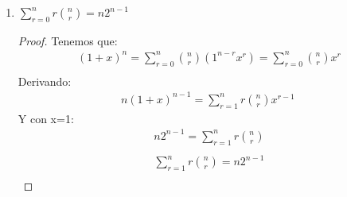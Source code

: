 \begin{enumerate}
\begin{enumerate}
\begin{proof}
\begin{align*}
                (x+y)^{n+1} &= (x+y)(x+y)^n = (x+y) \sum_{r=0}^{n+1} \binom{n}{r} x^{n-r}y^{r}\\
                &=x \sum_{r=0}^{n} \binom{n}{r} x^{n-r}y^{r} +  y \sum_{r=0}^{n} \binom{n}{r} x^{n-r}y^{r}\\
                &=\sum_{r=0}^{n} \binom{n}{r} x^{(n-1)-r}y^{r} +  y \sum_{r=1}^{n+1} \binom{n}{r-1} x^{n-(r-1)}y^{r}\\
                &=\binom{n}{0} x^{n+1}y^{0} + \sum_{r=1}^{n} \binom{n}{r} x^{(n+1)-r}y^{r} \\
                &+ \sum_{r=1}^{n} \binom{n}{r-1} x^{(n+1)-r}y^{r} + \binom{n}{n+r-1} x^{n-(r-1)}y^{n+1}\\
                &=x^{n+1} + \sum_{r=1}^{n} \binom{n}{r} x^{(n+1)-r}y^{r} +\sum_{r=1}^{n} \binom{n}{r-1} x^{n+1-r)}y^{r} + y^{n+1}\\
                &=x^{n+1} + \sum_{r=1}^{n} (\binom{n}{r} + \binom{n}{r-1}) x^{(n+1)-r}y^{r}+y^{n+1}\\
                &=x^{n+1}+\sum_{r=1}^{n} \binom{n+1}{r} (x^{(n+1)-r} y^r)\\
                &=\sum_{r=0}^{n+1} \binom{n+1}{r} (x^{(n+1)-r} y^r) \\
                \end{align*}
            \end{proof}
            \item $\sum_{r=0}^{n} r \binom{n}{r} = n2^{n-1} $
            \begin{proof}
                Tenemos que:
                \begin{gather*}
                {(1+x)}^n = \sum_{r=0}^{n} \binom{n}{r} (1^{n-r} x^r) =  \sum_{r=0}^{n} \binom{n}{r} x^r \\
                \end{gather*} Derivando: 
                \begin{gather*}
                n{(1+x)}^{n-1} = \sum_{r=1}^{n} r \binom{n}{r} {x^{r-1}} \
                \end{gather*} Y con x=1: 
                \begin{gather*}
                n2^{n-1} = \sum_{r=1}^{n} r \binom{n}{r} \\
                \end{gather*}
                \begin{gather*}
                \sum_{r=1}^{n} r \binom{n}{r} =  n2^{n-1} \\
                \end{gather*}

\end{proof}
\end{enumerate}
\end{enumerate}

